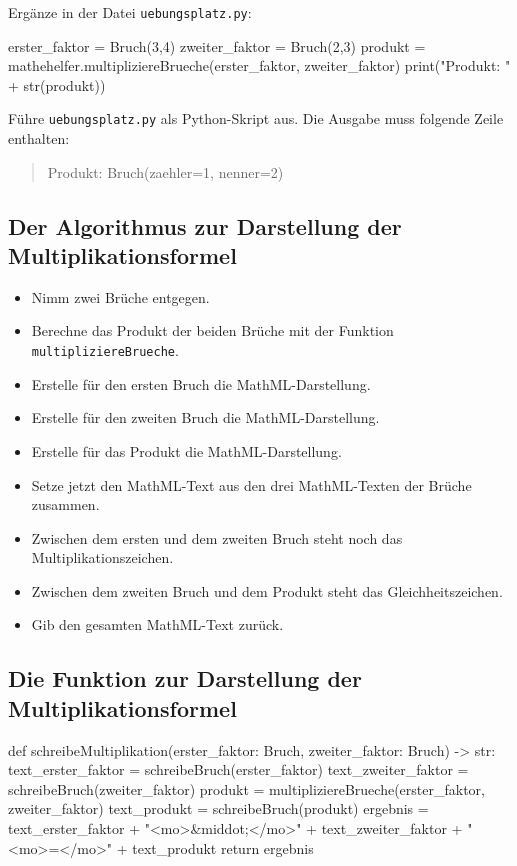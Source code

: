Ergänze in der Datei \texttt{uebungsplatz.py}:

\begin{codePython}
	erster_faktor = Bruch(3,4)
	zweiter_faktor = Bruch(2,3)
	produkt = mathehelfer.multipliziereBrueche(erster_faktor, zweiter_faktor)
	print("Produkt: " + str(produkt))
\end{codePython}

Führe \texttt{uebungsplatz.py} als Python-Skript aus. Die Ausgabe muss folgende Zeile enthalten:
\begin{quote}
	Produkt: Bruch(zaehler=1, nenner=2)
\end{quote}

\subsection*{Der Algorithmus zur Darstellung der Multiplikationsformel}

\begin{itemize}
	\item Nimm zwei Brüche entgegen.
	\item Berechne das Produkt der beiden Brüche mit der Funktion \texttt{multipliziereBrueche}.
	\item Erstelle für den ersten Bruch die MathML-Darstellung.
	\item Erstelle für den zweiten Bruch die MathML-Darstellung.
	\item Erstelle für das Produkt die MathML-Darstellung.
	\item Setze jetzt den MathML-Text aus den drei MathML-Texten der Brüche zusammen.
	\item Zwischen dem ersten und dem zweiten Bruch steht noch das Multiplikationszeichen.
	\item Zwischen dem zweiten Bruch und dem Produkt steht das Gleichheitszeichen.
	\item Gib den gesamten MathML-Text zurück.
\end{itemize}

\subsection*{Die Funktion zur Darstellung der Multiplikationsformel}

\begin{codePython}
def schreibeMultiplikation(erster_faktor: Bruch, zweiter_faktor: Bruch) -> str:
	text_erster_faktor = schreibeBruch(erster_faktor)
	text_zweiter_faktor = schreibeBruch(zweiter_faktor)
	produkt = multipliziereBrueche(erster_faktor, zweiter_faktor)
	text_produkt = schreibeBruch(produkt)
	ergebnis = text_erster_faktor + "<mo>&middot;</mo>" + text_zweiter_faktor + "<mo>=</mo>" + text_produkt
	return ergebnis
\end{codePython}

